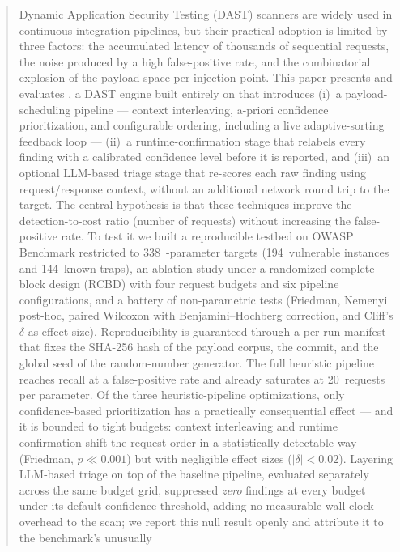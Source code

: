 \begin{abstract}
Dynamic Application Security Testing (DAST) scanners are widely used in
continuous-integration pipelines, but their practical adoption is limited by
three factors: the accumulated latency of thousands of sequential requests,
the noise produced by a high false-positive rate, and the combinatorial
explosion of the payload space per injection point. This paper presents and
evaluates \herramienta, a DAST engine built entirely on  that
introduces (i)~a payload-scheduling pipeline --- context interleaving,
a-priori confidence prioritization, and configurable ordering, including a
live adaptive-sorting feedback loop --- (ii)~a runtime-confirmation stage that
relabels every finding with a calibrated confidence level before it is
reported, and (iii)~an optional LLM-based triage stage that re-scores each raw
finding using request/response context, without an additional network round
trip to the target. The central hypothesis is that
these techniques improve the detection-to-cost ratio (number of requests)
without increasing the false-positive rate. To test it we built a reproducible
testbed on OWASP Benchmark restricted to \num{338}~-parameter
targets (\num{194}~vulnerable instances and \num{144}~known traps), an
ablation study under a randomized complete block design (RCBD) with four
request budgets and six pipeline configurations, and a battery of
non-parametric tests (Friedman, Nemenyi post-hoc, paired Wilcoxon with
Benjamini--Hochberg correction, and Cliff's $\delta$ as effect size).
Reproducibility is guaranteed through a per-run manifest that fixes the
SHA-256 hash of the payload corpus, the  commit, and the global seed
of the random-number generator. The full heuristic pipeline reaches
\ValorRecallTecho{} recall at a \ValorFPRBaseline{} false-positive rate and
already saturates at \num{20}~requests per parameter. Of the three
heuristic-pipeline optimizations, only confidence-based prioritization has a
practically consequential effect --- and it is bounded to tight budgets:
context interleaving and runtime confirmation shift the request order in a
statistically detectable way (Friedman, $p \ll 0.001$) but with negligible
effect sizes ($\lvert\delta\rvert < 0.02$). Layering LLM-based triage on top
of the baseline pipeline, evaluated separately across the same budget grid,
suppressed \emph{zero} findings at every budget under its default confidence
threshold, adding no measurable wall-clock overhead to the scan; we report
this null result openly and attribute it to the benchmark's unusually

\end{abstract}
